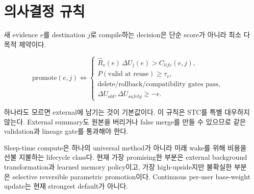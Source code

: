 \section{의사결정 규칙}

새 evidence $e$를 destination $j$로 compile하는 decision은 단순 score가 아니라 최소 다목적 제약이다.

\begin{equation}
\text{promote}(e,j) \Longleftrightarrow
\begin{cases}
\widehat R_v(e)\,\Delta U_j(e) > C_{life}(e,j),\\
P(\text{valid at reuse}) \ge \tau_v,\\
\text{delete/rollback/compatibility gates pass},\\
\Delta U_{old},\Delta U_{safety} \ge -\epsilon.
\end{cases}
\end{equation}

하나라도 모르면 external에 남기는 것이 기본값이다. 이 규칙은 STC를 특별 대우하지 않는다. External
summary도 원본을 버리거나 false merge를 만들 수 있으므로 같은 validation과 lineage gate를 통과해야
한다.

\begin{keypoint}
Sleep-time compute은 하나의 universal method가 아니라 미래 wake를 위해 비용을 선불 지불하는 lifecycle
class다. 현재 가장 promising한 부분은 external background transformation과 learned memory policy이고,
가장 high-upside지만 불확실한 부분은 selective reversible parametric promotion이다. Continuous per-user
base-weight update는 현재 strongest default가 아니다.
\end{keypoint}
